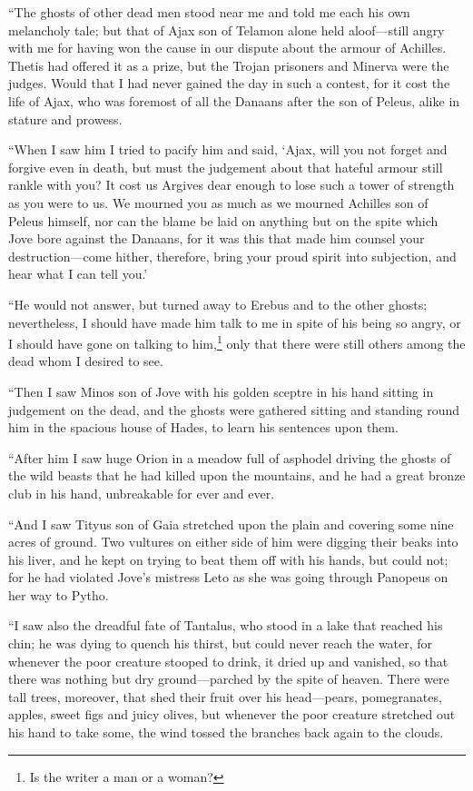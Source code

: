 “The ghosts of other dead men stood near me and told me each his own melancholy
tale; but that of Ajax son of Telamon alone held aloof—still angry with me for
having won the cause in our dispute about the armour of Achilles. Thetis had
offered it as a prize, but the Trojan prisoners and Minerva were the judges.
Would that I had never gained the day in such a contest, for it cost the life
of Ajax, who was foremost of all the Danaans after the son of Peleus, alike in
stature and prowess.

“When I saw him I tried to pacify him and said, ‘Ajax, will you not forget and
forgive even in death, but must the judgement about that hateful armour still
rankle with you? It cost us Argives dear enough to lose such a tower of
strength as you were to us. We mourned you as much as we mourned Achilles son
of Peleus himself, nor can the blame be laid on anything but on the spite which
Jove bore against the Danaans, for it was this that made him counsel your
destruction—come hither, therefore, bring your proud spirit into subjection,
and hear what I can tell you.’

“He would not answer, but turned away to Erebus and to the other ghosts;
nevertheless, I should have made him talk to me in spite of his being so angry,
or I should have gone on talking to him,\footnote{Is the writer a man or a woman?} only that there were still others
among the dead whom I desired to see.

“Then I saw Minos son of Jove with his golden sceptre in his hand sitting in
judgement on the dead, and the ghosts were gathered sitting and standing round
him in the spacious house of Hades, to learn his sentences upon them.

“After him I saw huge Orion in a meadow full of asphodel driving the ghosts of
the wild beasts that he had killed upon the mountains, and he had a great
bronze club in his hand, unbreakable for ever and ever.

“And I saw Tityus son of Gaia stretched upon the plain and covering some nine
acres of ground. Two vultures on either side of him were digging their beaks
into his liver, and he kept on trying to beat them off with his hands, but
could not; for he had violated Jove’s mistress Leto as she was going through
Panopeus on her way to Pytho.

“I saw also the dreadful fate of Tantalus, who stood in a lake that reached his
chin; he was dying to quench his thirst, but could never reach the water, for
whenever the poor creature stooped to drink, it dried up and vanished, so that
there was nothing but dry ground—parched by the spite of heaven. There were
tall trees, moreover, that shed their fruit over his head—pears, pomegranates,
apples, sweet figs and juicy olives, but whenever the poor creature stretched
out his hand to take some, the wind tossed the branches back again to the
clouds.

